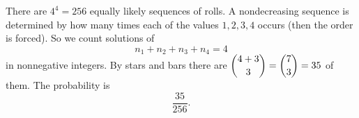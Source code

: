 There are $4^4=256$ equally likely sequences of rolls. A nondecreasing sequence is determined by how many times each of the values $1,2,3,4$ occurs (then the order is forced). So we count solutions of
\[n_1+n_2+n_3+n_4=4\]
in nonnegative integers. By stars and bars there are $\dbinom{4+3}{3}=\dbinom73=35$ of them. The probability is
\[\boxed{\dfrac{35}{256}}.\]

